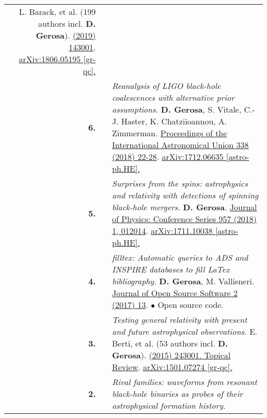 {\begin{longtable}{rp{0.3cm}p{15.8cm}}
\newline{}
L. Barack, et al. (199 authors incl. \textbf{D. Gerosa}).
\newline{}
\href{https://iopscience.iop.org/article/10.1088/1361-6382/ab0587}{\cqg 36 (2019) 143001}. \href{https://arxiv.org/abs/1806.05195}{arXiv:1806.05195 [gr-qc].}
\vspace{0.09cm}\\
%
\textbf{6.} & & \textit{Reanalysis of LIGO black-hole coalescences with alternative prior assumptions.}
\newline{}
\textbf{D. Gerosa}, S. Vitale, C.-J. Haster, K. Chatziioannou, A. Zimmerman.
\newline{}
\href{https://doi.org/10.1017/S1743921318003587}{Proceedings of the International Astronomical Union 338 (2018) 22-28}. \href{https://arxiv.org/abs/1712.06635}{arXiv:1712.06635 [astro-ph.HE].}
\vspace{0.09cm}\\
%
\textbf{5.} & & \textit{Surprises from the spins: astrophysics and relativity with detections of spinning black-hole mergers.}
\newline{}
\textbf{D. Gerosa}.
\newline{}
\href{http://dx.doi.org/10.1088/1742-6596/957/1/012014}{Journal of Physics: Conference Series 957 (2018) 1, 012014}. \href{https://arxiv.org/abs/1711.10038}{arXiv:1711.10038 [astro-ph.HE].}
\vspace{0.09cm}\\
%
\textbf{4.} & & \textit{filltex: Automatic queries to ADS and INSPIRE databases to fill LaTex bibliography.}
\newline{}
\textbf{D. Gerosa}, M. Vallisneri.
\newline{}
\href{http://dx.doi.org/10.21105/joss.00222}{Journal of Open Source Software 2 (2017) 13}. 
\newline{}
\textcolor{color1}{$\bullet$} Open source code.
\vspace{0.09cm}\\
%
\textbf{3.} & & \textit{Testing general relativity with present and future astrophysical observations.}
\newline{}
E. Berti, et al. (53 authors incl. \textbf{D. Gerosa}).
\newline{}
\href{http://dx.doi.org/10.1088/0264-9381/32/24/243001}{\cqg 32 (2015) 243001. Topical Review}. \href{https://arxiv.org/abs/1501.07274}{arXiv:1501.07274 [gr-qc].}
\vspace{0.09cm}\\
%
\textbf{2.} & & \textit{Rival families: waveforms from resonant black-hole binaries as probes of their astrophysical formation history.}

\end{longtable}}
